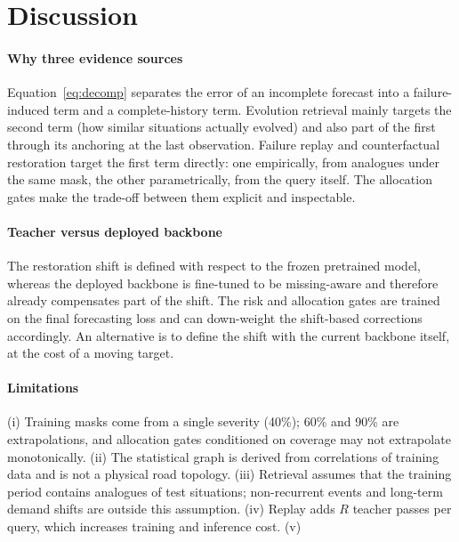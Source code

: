 \section{Discussion}
\label{sec:discussion}

\paragraph{Why three evidence sources}
Equation~\eqref{eq:decomp} separates the error of an incomplete forecast into a failure-induced term and a complete-history term. Evolution retrieval mainly targets the second term (how similar situations actually evolved) and also part of the first through its anchoring at the last observation. Failure replay and counterfactual restoration target the first term directly: one empirically, from analogues under the same mask, the other parametrically, from the query itself. The allocation gates make the trade-off between them explicit and inspectable. 

\paragraph{Teacher versus deployed backbone}
The restoration shift is defined with respect to the frozen pretrained model, whereas the deployed backbone is fine-tuned to be missing-aware and therefore already compensates part of the shift. The risk and allocation gates are trained on the final forecasting loss and can down-weight the shift-based corrections accordingly. An alternative is to define the shift with the current backbone itself, at the cost of a moving target. 

\paragraph{Limitations}
(i) Training masks come from a single severity (40\%); 60\% and 90\% are extrapolations, and allocation gates conditioned on coverage may not extrapolate monotonically. (ii) The statistical graph is derived from correlations of training data and is not a physical road topology. (iii) Retrieval assumes that the training period contains analogues of test situations; non-recurrent events and long-term demand shifts are outside this assumption. (iv) Replay adds $R$ teacher passes per query, which increases training and inference cost. (v) 
